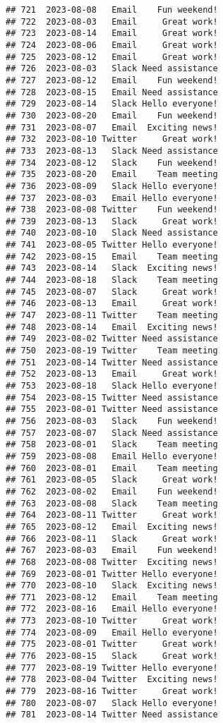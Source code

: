 \documentclass[
]{article}
\begin{document}
\begin{verbatim}
## 721  2023-08-08   Email    Fun weekend!
## 722  2023-08-03   Email     Great work!
## 723  2023-08-14   Email     Great work!
## 724  2023-08-06   Email     Great work!
## 725  2023-08-12   Email     Great work!
## 726  2023-08-03   Slack Need assistance
## 727  2023-08-12   Email    Fun weekend!
## 728  2023-08-15   Email Need assistance
## 729  2023-08-14   Slack Hello everyone!
## 730  2023-08-20   Email    Fun weekend!
## 731  2023-08-07   Email  Exciting news!
## 732  2023-08-10 Twitter     Great work!
## 733  2023-08-13   Slack Need assistance
## 734  2023-08-12   Slack    Fun weekend!
## 735  2023-08-20   Email    Team meeting
## 736  2023-08-09   Slack Hello everyone!
## 737  2023-08-03   Email Hello everyone!
## 738  2023-08-08 Twitter    Fun weekend!
## 739  2023-08-13   Slack     Great work!
## 740  2023-08-10   Slack Need assistance
## 741  2023-08-05 Twitter Hello everyone!
## 742  2023-08-15   Email    Team meeting
## 743  2023-08-14   Slack  Exciting news!
## 744  2023-08-18   Slack    Team meeting
## 745  2023-08-07   Slack     Great work!
## 746  2023-08-13   Email     Great work!
## 747  2023-08-11 Twitter    Team meeting
## 748  2023-08-14   Email  Exciting news!
## 749  2023-08-02 Twitter Need assistance
## 750  2023-08-19 Twitter    Team meeting
## 751  2023-08-14 Twitter Need assistance
## 752  2023-08-13   Email     Great work!
## 753  2023-08-18   Slack Hello everyone!
## 754  2023-08-15 Twitter Need assistance
## 755  2023-08-01 Twitter Need assistance
## 756  2023-08-03   Slack    Fun weekend!
## 757  2023-08-07   Slack Need assistance
## 758  2023-08-01   Slack    Team meeting
## 759  2023-08-08   Email Hello everyone!
## 760  2023-08-01   Email    Team meeting
## 761  2023-08-05   Slack     Great work!
## 762  2023-08-02   Email    Fun weekend!
## 763  2023-08-08   Slack    Team meeting
## 764  2023-08-11 Twitter     Great work!
## 765  2023-08-12   Email  Exciting news!
## 766  2023-08-11   Slack     Great work!
## 767  2023-08-03   Email    Fun weekend!
## 768  2023-08-08 Twitter  Exciting news!
## 769  2023-08-01 Twitter Hello everyone!
## 770  2023-08-10   Slack  Exciting news!
## 771  2023-08-12   Email    Team meeting
## 772  2023-08-16   Email Hello everyone!
## 773  2023-08-10 Twitter     Great work!
## 774  2023-08-09   Email Hello everyone!
## 775  2023-08-01 Twitter     Great work!
## 776  2023-08-15   Slack     Great work!
## 777  2023-08-19 Twitter Hello everyone!
## 778  2023-08-04 Twitter  Exciting news!
## 779  2023-08-16 Twitter     Great work!
## 780  2023-08-07   Slack Hello everyone!
## 781  2023-08-14 Twitter Need assistance

\end{verbatim}
\end{document}
